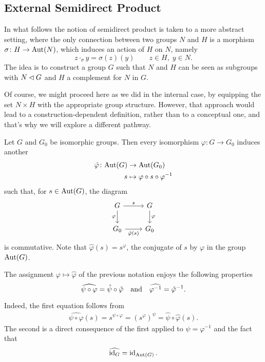 \subsection*{External Semidirect Product} In what follows the notion of semidirect product is taken to a more abstract setting, where the only connection between two groups $N$ and $H$ is a morphism $\sigma\colon H\to{\rm Aut}(N)$, which induces an action of $H$ on $N$, namely
$$
    z\cdot_\sigma y = \sigma(z)(y)\qquad z\in H,\; y\in N.
$$
The idea is to construct a group $G$ such that $N$ and $H$ can be seen as subgroups with $N\lhd G$ and $H$ a complement for $N$ in $G$.

Of course, we might proceed here as we did in the internal case, by equipping the set $N\times H$ with the appropriate group structure. However, that approach would lead to a construction-dependent definition, rather than to a conceptual one, and that's why we will explore a different pathway.

\begin{ntn}
    Let\/ $G$ and $G_0$ be isomorphic groups. Then every isomorphism\/ $\varphi\colon G\to G_0$ induces another
    \begin{align*}
        \hat\varphi\colon{\rm Aut}(G)&\to{\rm Aut}(G_0)\\
        s&\mapsto \varphi\circ s\circ\varphi^{-1}
    \end{align*}
    such that, for $s\in{\rm Aut}(G)$, the diagram
    $$
        \begin{tikzcd}
            G\arrow[r,"s"]\arrow[d, "\varphi"']
            &G\arrow[d,"\varphi"]
                \\
            G_0\arrow[r,"\hat\varphi(s)"']
            &G_0
        \end{tikzcd}
    $$    
    is commutative. Note that\/ $\hat\varphi(s)=s^\varphi$, the conjugate of\/ $s$ by\/ $\varphi$ in the group\/ ${\rm Aut}(G)$.
\end{ntn}

\begin{rem}\label{functorial-hat}
    The assignment $\varphi\mapsto\hat\varphi$ of the previous notation enjoys the following properties
    $$
        \widehat{\psi\circ\varphi}=\hat\psi\circ\hat\varphi
        \quad{\rm and}\quad
        \widehat{\varphi^{-1}}=\hat\varphi^{-1}.
    $$
\end{rem}
    {\small Indeed, the first equation follows from
    \begin{align*}
        \widehat{\psi\circ\varphi}(s)=s^{\psi\circ\varphi}=(s^\varphi)^\psi
            =\hat\psi\circ\hat\varphi(s).
    \end{align*}
    The second is a direct consequence of the first applied to $\psi=\varphi^{-1}$ and the fact that
    $$
        \widehat{\operatorname{id}_G}=\operatorname{id}_{{\rm Aut}(G)}.
    $$
    }

